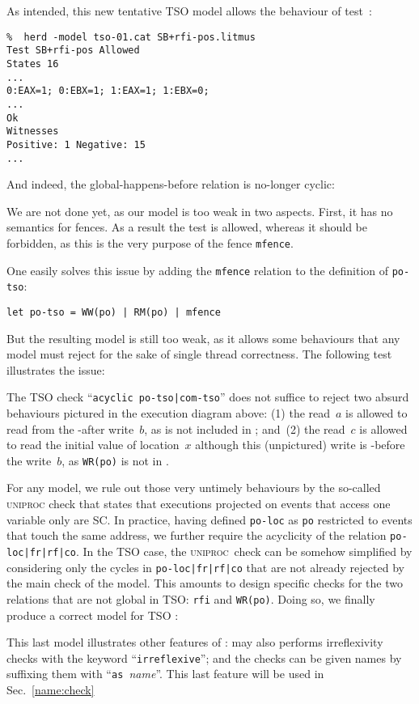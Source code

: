 As intended, this new tentative TSO model allows the behaviour of test~:
\begin{verbatim}
%  herd -model tso-01.cat SB+rfi-pos.litmus
Test SB+rfi-pos Allowed
States 16
...
0:EAX=1; 0:EBX=1; 1:EAX=1; 1:EBX=0;
...
Ok
Witnesses
Positive: 1 Negative: 15
...
\end{verbatim}
And indeed, the global-happens-before relation is no-longer cyclic:
\begin{center}\end{center}


We are not done yet, as our model is too weak in two aspects.
First, it has no semantics for fences.
As a result the test  is allowed, whereas it should
be forbidden, as this is the very purpose of the fence \texttt{mfence}.
\begin{center}\end{center}
One easily solves this issue by adding the \verb+mfence+ relation
to the definition of \verb+po-tso+:
\begin{verbatim}
let po-tso = WW(po) | RM(po) | mfence
\end{verbatim}

But the resulting model is still too weak,
as it allows some behaviours that any model must
reject for the sake of single thread correctness.
The following test  illustrates the issue:

\begin{center}\end{center}
The TSO check ``\verb+acyclic po-tso|com-tso+'' does not suffice to reject
two absurd behaviours pictured in the execution diagram above:
(1) the read~$a$ is allowed to
read from the -after write~$b$, as  is not included
in ; and~(2)
the read~$c$ is allowed to read the initial value of location~$x$
although
this (unpictured) write is -before the write~$b$,
as \verb+WR(po)+ is not in .

\label{defuniproc}For any model, we rule out those very
untimely behaviours by the so-called
\textsc{uniproc}
check that states that executions projected on events that access one variable
only are SC.
In practice, having defined \verb+po-loc+ as \verb+po+ restricted to
events that touch the same address, we further require the acyclicity
of the relation \verb+po-loc|fr|rf|co+.
In the TSO case, the \textsc{uniproc}~check can be
somehow simplified by considering only
the cycles in \verb+po-loc|fr|rf|co+ that 
are not already rejected by the main check of the model.
This amounts to design specific checks for the two relations that are
not global in TSO: \verb+rfi+ and \verb+WR(po)+.
Doing so, we finally produce a correct model for TSO :

This last model illustrates other features of \herd{}:
\herd{} may also performs irreflexivity checks with the keyword
``\verb+irreflexive+''; and
the checks can be given names by suffixing them with
``\texttt{as~}\textit{name}''.
This last feature will be used in Sec.~\ref{name:check}


